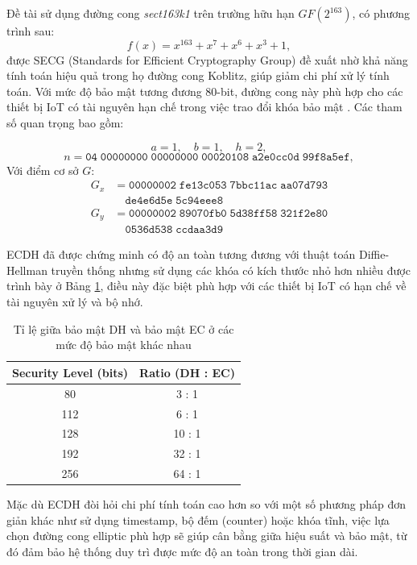 Đề tài sử dụng đường cong \textit{sect163k1} trên trường hữu hạn $GF(2^{163})$, có phương trình sau:
\[
f(x) = x^{163} + x^7 + x^6 + x^3 + 1,
\]
được SECG (Standards for Efficient Cryptography Group) đề xuất nhờ khả năng tính toán hiệu quả trong họ đường cong Koblitz, giúp giảm chi phí xử lý tính toán. Với mức độ bảo mật tương đương 80-bit, đường cong này phù hợp cho các thiết bị IoT có tài nguyên hạn chế trong việc trao đổi khóa bảo mật \cite{secg}. Các tham số quan trọng bao gồm:

\[
a = 1, \quad b = 1, \quad h = 2,
\]
\[
n = \mathtt{04\; 00000000\; 00000000\; 00020108\; a2e0cc0d\; 99f8a5ef},
\]
Với điểm cơ sở \(G\):
\[
\begin{aligned}
G_x &= \mathtt{00000002\; fe13c053\; 7bbc11ac\; aa07d793} \\
    &\quad \mathtt{de4e6d5e\; 5c94eee8} \\
G_y &= \mathtt{00000002\; 89070fb0\; 5d38ff58\; 321f2e80} \\
    &\quad \mathtt{0536d538\; ccdaa3d9}
\end{aligned}
\]

ECDH đã được chứng minh có độ an toàn tương đương với thuật toán Diffie-Hellman truyền thống nhưng sử dụng các khóa có kích thước nhỏ hơn nhiều \cite{ecc-review} được trình bày ở Bảng \ref{tab:dh_ec_security}, điều này đặc biệt phù hợp với các thiết bị IoT có hạn chế về tài nguyên xử lý và bộ nhớ.

\begin{table}[h]
\centering
\small
\caption{Tỉ lệ giữa bảo mật DH và bảo mật EC ở các mức độ bảo mật khác nhau}
\label{tab:dh_ec_security}
\begin{tabular}{|c|c|}
\hline
\textbf{Security Level (bits)} & \textbf{Ratio (DH : EC)} \\
\hline
80  & 3 : 1  \\
\hline
112 & 6 : 1  \\
\hline
128 & 10 : 1 \\
\hline
192 & 32 : 1 \\
\hline
256 & 64 : 1 \\
\hline
\end{tabular}
\end{table}

Mặc dù ECDH đòi hỏi chi phí tính toán cao hơn so với một số phương pháp đơn giản khác như sử dụng timestamp, bộ đếm (counter) hoặc khóa tĩnh, việc lựa chọn đường cong elliptic phù hợp sẽ giúp cân bằng giữa hiệu suất và bảo mật, từ đó đảm bảo hệ thống duy trì được mức độ an toàn trong thời gian dài.

